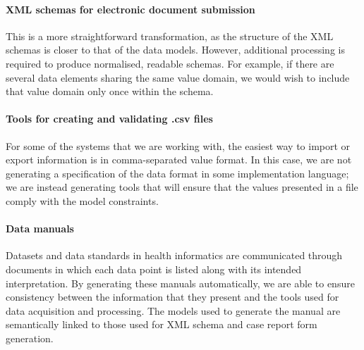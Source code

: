 \paragraph{XML schemas for electronic document submission}  This is a
more straightforward transformation, as the structure of the XML
schemas is closer to that of the data models.  However, additional
processing is required to produce normalised, readable schemas.  For
example, if there are several data elements sharing the same value
domain, we would wish to include that value domain only once within
the schema.

\paragraph{Tools for creating and validating .csv files}  For some of
the systems that we are working with, the easiest way to import or
export information is in comma-separated value format.  In this case,
we are not generating a specification of the data format in some
implementation language; we are instead generating tools that will
ensure that the values presented in a file comply with the model
constraints.

\paragraph{Data manuals}  Datasets and data standards in health
  informatics are communicated through documents in which each data
  point is listed along with its intended interpretation.  By
  generating these manuals automatically, we are able to ensure
  consistency between the information that they present and the tools
  used for data acquisition and processing.  The models used to
  generate the manual are semantically linked to those used for XML
  schema and case report form generation. 

